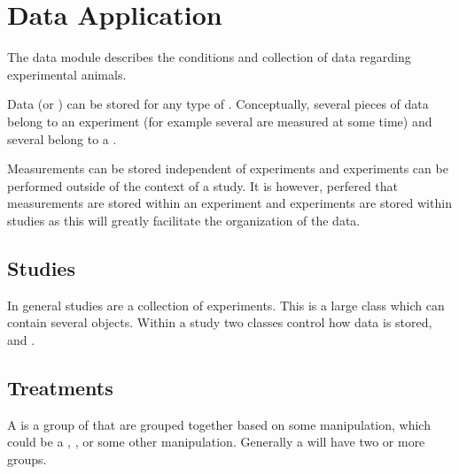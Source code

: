 \documentclass[letterpaper,10pt,english]{sphinxmanual}
\begin{document}
\section{Data Application}
\label{data::doc}\label{data:module-mousedb.data}\label{data:data-application}
The data module describes the conditions and collection of data regarding experimental animals.

Data (or {\hyperref[data:mousedb.data.models.Measurement]{}}) can be stored for any type of {\hyperref[data:mousedb.data.models.Experiment]{}}.  Conceptually, several pieces of data belong to an experiment (for example several {\hyperref[animals:mousedb.animal.models.Animal]{}} are measured at some time) and several {\hyperref[data:mousedb.data.models.Experiment]{}} belong to a {\hyperref[data:mousedb.data.models.Study]{}}.

Measurements can be stored independent of experiments and experiments can be performed outside of the context of a study.  It is however, perfered that measurements are stored within an experiment and experiments are stored within studies as this will greatly facilitate the organization of the data.


\subsection{Studies}
\label{data:studies}
In general studies are a collection of experiments.  This is a large class which can contain several {\hyperref[data:mousedb.data.models.Experiment]{}} objects.  Within a study two classes control how data is stored, {\hyperref[data:mousedb.data.models.Treatment]{}} and {\hyperref[data:mousedb.data.models.Cohort]{}}.


\subsection{Treatments}
\label{data:treatments}
A {\hyperref[data:mousedb.data.models.Treatment]{}} is a group of  that are grouped together based on some manipulation, which could be a {\hyperref[data:mousedb.data.models.Pharmaceutical]{}}, {\hyperref[data:mousedb.data.models.Diet]{}}, {\hyperref[data:mousedb.data.models.Implantation]{}} or some other manipulation.  Generally a {\hyperref[data:mousedb.data.models.Study]{}} will have two or more {\hyperref[data:mousedb.data.models.Treatment]{}} groups.
\end{document}
